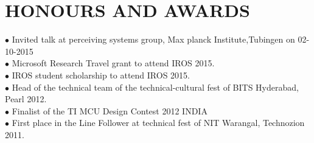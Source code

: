 \documentclass[a4paper,10pt]{article}
\begin{document}

\section{HONOURS AND AWARDS}
$\bullet$  Invited talk at perceiving systems group, Max planck Institute,Tubingen on 02-10-2015\\
$\bullet$  Microsoft Research Travel grant to attend IROS 2015.\\
$\bullet$ IROS student scholarship to attend IROS 2015.\\
$\bullet$ Head of the technical team of the technical-cultural fest of BITS Hyderabad, Pearl 2012.\\
$\bullet$  Finalist of the TI MCU Design Contest 2012 INDIA \\
$\bullet$  First place in the Line Follower at technical fest of NIT Warangal, Technozion 2011.\\


\end{document}
